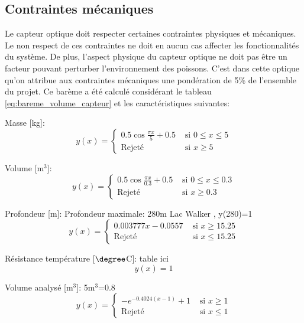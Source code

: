\subsection{Contraintes mécaniques}

Le capteur optique doit respecter certaines contraintes physiques et mécaniques. Le non respect de ces contraintes ne doit en aucun cas affecter les fonctionnalités du système. De plus, l'aspect physique du capteur optique ne doit pas être un facteur pouvant perturber l'environnement des poissons. C'est dans cette optique qu'on attribue aux contraintes mécaniques une pondération de 5\% de l'ensemble du projet. Ce barème a été calculé considérant le tableau \ref{eq:bareme_volume_capteur} et les caractéristiques suivantes:

Masse [kg]:
\begin{equation}
y(x) = \begin{cases}
        0.5 \cos{\frac{\pi x}{5}} + 0.5 & \text{ si } 0 \le x \leq 5\\
        \text{Rejeté} & \text{ si } x \ge 5
    \end{cases}
    \label{eq:bareme_masse_capteur}
\end{equation}

Volume [m$^3$]:
\begin{equation}
y(x) = \begin{cases}
        0.5 \cos{\frac{\pi x}{0.3}} + 0.5 & \text{ si }0 \le x \leq 0.3\\
        \text{Rejeté} & \text{ si } x \ge 0.3
    \end{cases}
    \label{eq:bareme_volume_capteur}
\end{equation}

Profondeur [m]:
Profondeur maximale: 280m Lac Walker \cite{Lac_walker}, y(280)=1
\begin{equation}
y(x) = \begin{cases}
        0.003777x-0.0557 & \text{ si } x \geq 15.25\\
        \text{Rejeté} & \text{ si } x \le 15.25
    \end{cases}
    \label{eq:bareme_profondeur}
\end{equation}

Résistance température [$\degree$C]: table ici
\begin{equation}
    y(x) = 1
    \label{eq:bareme_res_temperature}
\end{equation}

Volume analysé [m$^3$]:
5m$^3$=0.8
\begin{equation}
y(x) = \begin{cases}
        -e^{-0.4024(x-1)}+1 & \text{ si } x \geq 1\\
        \text{Rejeté} & \text{ si } x \le 1
    \end{cases}
    \label{eq:bareme_volume_analyse}
\end{equation}

